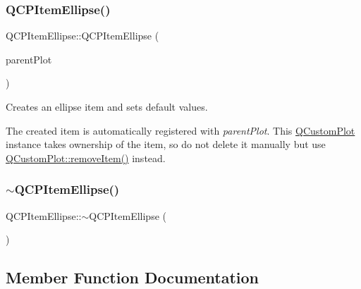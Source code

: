 \subsubsection{\texorpdfstring{Q\+C\+P\+Item\+Ellipse()}{QCPItemEllipse()}}
{\footnotesize\ttfamily Q\+C\+P\+Item\+Ellipse\+::\+Q\+C\+P\+Item\+Ellipse (\begin{DoxyParamCaption}\item[{\hyperlink{class_q_custom_plot}{Q\+Custom\+Plot} $\ast$}]{parent\+Plot }\end{DoxyParamCaption})\hspace{0.3cm}{\ttfamily [explicit]}}

Creates an ellipse item and sets default values.

The created item is automatically registered with {\itshape parent\+Plot}. This \hyperlink{class_q_custom_plot}{Q\+Custom\+Plot} instance takes ownership of the item, so do not delete it manually but use \hyperlink{class_q_custom_plot_ae04446557292551e8fb6e2c106e1848d}{Q\+Custom\+Plot\+::remove\+Item()} instead. \mbox{\label{class_q_c_p_item_ellipse_a3c17073a1805d32b4e09b6ccde0bef76}} 
\subsubsection{\texorpdfstring{$\sim$\+Q\+C\+P\+Item\+Ellipse()}{~QCPItemEllipse()}}
{\footnotesize\ttfamily Q\+C\+P\+Item\+Ellipse\+::$\sim$\+Q\+C\+P\+Item\+Ellipse (\begin{DoxyParamCaption}{ }\end{DoxyParamCaption})\hspace{0.3cm}{\ttfamily [virtual]}}



\subsection{Member Function Documentation}
\mbox{\label{class_q_c_p_item_ellipse_a35cd6983c61a16ac33c23f08dd2817cc}} 

